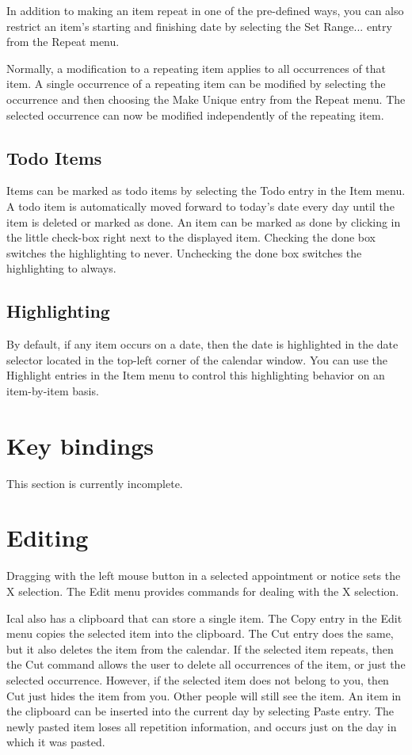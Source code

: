 \documentclass[a4paper,english]{article}
\begin{document}
        In addition to making an item repeat in one of the pre-defined
        ways, you can also restrict an item's starting and finishing
        date by selecting the Set Range... entry from the Repeat menu.

        Normally, a modification to a repeating item applies to all
        occurrences of that item. A single occurrence of a repeating
        item can be modified by selecting the occurrence and then
        choosing the Make Unique entry from the Repeat menu.  The
        selected occurrence can now be modified independently of the
        repeating item.

    \subsection{Todo Items}
        Items can be marked as todo items by selecting the Todo entry
        in the Item menu.  A todo item is automatically moved forward
        to today's date every day until the item is deleted or marked
        as done.  An item can be marked as done by clicking in the
        little check-box right next to the displayed item. Checking
        the done box switches the highlighting to never. Unchecking
        the done box switches the highlighting to always.

    \subsection{Highlighting}
        By default, if any item occurs on a date, then the date is
        highlighted in the date selector located in the top-left
        corner of the calendar window.  You can use the Highlight
        entries in the Item menu to control this highlighting behavior
        on an item-by-item basis.

\section{Key bindings}
    This section is currently incomplete.

\section{Editing}
    Dragging with the left mouse button in a selected appointment or
    notice sets the X selection.  The Edit menu provides commands for
    dealing with the X selection.

    Ical also has a clipboard that can store a single item. The Copy
    entry in the Edit menu copies the selected item into the
    clipboard.  The Cut entry does the same, but it also deletes the
    item from the calendar. If the selected item repeats, then the Cut
    command allows the user to delete all occurrences of the item, or
    just the selected occurrence.  However, if the selected item does
    not belong to you, then Cut just hides the item from you.  Other
    people will still see the item.  An item in the clipboard can be
    inserted into the current day by selecting Paste entry. The newly
    pasted item loses all repetition information, and occurs just on
    the day in which it was pasted.
\end{document}
